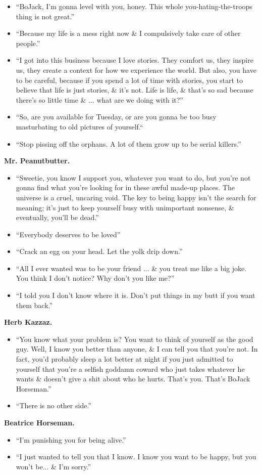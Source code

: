 \documentclass{article}
\begin{document}
\begin{enumerate}
\begin{itemize}
    	\item ``BoJack, I'm gonna level with you, honey. This whole you-hating-the-troops thing is not great.''
    	\item ``Because my life is a mess right now \& I compulsively take care of other people.''
    	\item ``I got into this business because I love stories. They comfort us, they inspire us, they create a context for how we experience the world. But also, you have to be careful, because if you spend a lot of time with stories, you start to believe that life is just stories, \& it's not. Life is life, \& that's so sad because there's so little time \& ... what are we doing with it?''
    	\item ``So, are you available for Tuesday, or are you gonna be too busy masturbating to old pictures of yourself.``
    	\item ``Stop pissing off the orphans. A lot of them grow up to be serial killers.''
    \end{itemize}
    {\bf Mr. Peanutbutter.}
    \begin{itemize}
    	\item ``Sweetie, you know I support you, whatever you want to do, but you're not gonna find what you're looking for in these awful made-up places. The universe is a cruel, uncaring void. The key to being happy isn't the search for meaning; it's just to keep yourself busy with unimportant nonsense, \& eventually, you'll be dead.''
    	\item ``Everybody deserves to be loved''
    	\item ``Crack an egg on your head. Let the yolk drip down.''
    	\item ``All I ever wanted was to be your friend ... \& you treat me like a big joke. You think I don't notice? Why don't you like me?''
    	\item ``I told you I don't know where it is. Don't put things in my butt if you want them back.''
    \end{itemize}
    {\bf Herb Kazzaz.}
    \begin{itemize}
    	\item ``You know what your problem is? You want to think of yourself as the good guy. Well, I know you better than anyone, \& I can tell you that you're not. In fact, you'd probably sleep a lot better at night if you just admitted to yourself that you're a selfish goddamn coward who just takes whatever he wants \& doesn't give a shit about who he hurts. That's you. That's BoJack Horseman.''
    	\item ``There is no other side.''
    \end{itemize}
    {\bf Beatrice Horseman.}
    \begin{itemize}
    	\item ``I'm punishing you for being alive.''
    	\item ``I just wanted to tell you that I know. I know you want to be happy, but you won't be... \& I'm sorry.''


\end{itemize}
\end{enumerate}
\end{document}
